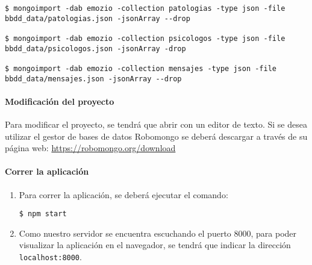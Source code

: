 \begin{enumerate}
\begin{enumerate}
\begin{lstlisting}[style=consola, numbers=none]
$ mongoimport -dab emozio -collection patologias -type json -file bbdd_data/patologias.json -jsonArray --drop
	
$ mongoimport -dab emozio -collection psicologos -type json -file bbdd_data/psicologos.json -jsonArray -drop
	
$ mongoimport -dab emozio -collection mensajes -type json -file bbdd_data/mensajes.json -jsonArray --drop
	\end{lstlisting}
\end{enumerate}
\end{enumerate}


\paragraph*{Modificación del proyecto}


Para modificar el proyecto, se tendrá que abrir con un editor de texto.
Si se desea utilizar el gestor de bases de datos Robomongo se deberá descargar a través de su página web: \url{https://robomongo.org/download} 

\paragraph*{Correr la aplicación}
\begin{enumerate}
\item Para correr la aplicación, se deberá ejecutar el comando:
	\begin{lstlisting}[style=consola, numbers=none]
	$ npm start
	\end{lstlisting}
\item Como nuestro servidor se encuentra escuchando el puerto 8000, para poder visualizar la aplicación en el navegador, se tendrá que indicar la dirección \texttt{localhost:8000}.
\end{enumerate}